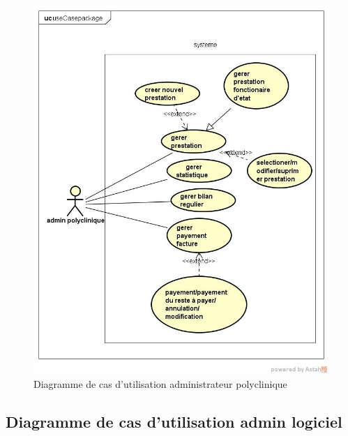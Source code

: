 	  \begin{figure}[h]
	  \centering
	  
	   \includegraphics[scale=0.5]{Chapitre2/images/ucdadminPolyclinique.jpg}
	    \caption{Diagramme de cas d'utilisation administrateur polyclinique }
	  \end{figure}
	 
\newpage

	\subsection{Diagramme de cas d'utilisation admin logiciel}
	  
